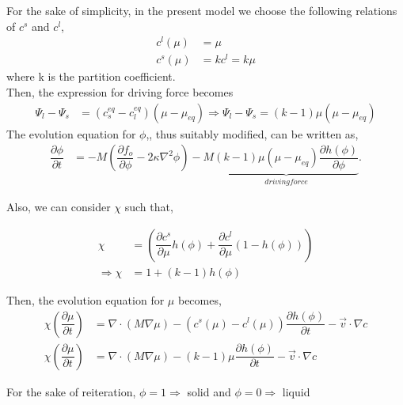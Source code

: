 \documentclass[12pt,a4paper]{report}
\begin{document}
For the sake of simplicity, in the present model we choose the following relations of $c^s$ and $c^l$,
\begin{align}
c^l\left(\mu\right) &= \mu \\
c^s\left(\mu\right) &= kc^l = k\mu
\end{align}
where k is the partition coefficient.\\

Then, the expression for driving force becomes
\begin{align}
 \Psi_l-\Psi_s &= (c_s^{eq} - c_l^{eq})\left(\mu-\mu_{eq}\right)
\Rightarrow \Psi_l-\Psi_s = (k - 1)\mu\left(\mu-\mu_{eq}\right)
\end{align} 
The evolution equation for $\phi$,, thus suitably modified, can be written as,
  \begin{align}
  \dfrac{\partial \phi}{\partial t} &= -M \left(\dfrac{\partial f_o}{\partial \phi} - 2\kappa\nabla^{2}\phi\right)  
					-M\underbrace{(k - 1)\mu\left(\mu-\mu_{eq}\right)\dfrac{\partial h\left(\phi\right)}{\partial \phi}}_{driving force}.
  \end{align}

Also, we can consider $\chi$ such that,

\begin{align}
	\chi  &= \left(\dfrac{\partial c^s}{\partial \mu}h\left(\phi\right) + \dfrac{\partial c^l}{\partial \mu}(1-h\left(\phi\right))\right)\\
	\Rightarrow\chi &= 1 + \left(k-1\right)h\left(\phi\right)
\end{align}

Then, the evolution equation for $\mu$ becomes,
\begin{align}
		\chi \left(\dfrac{\partial \mu}{\partial t}\right) &= \nabla \cdot \left(M\nabla\mu\right) 
	- \left(c^s\left(\mu\right) - c^l \left(\mu\right)\right)\dfrac{\partial h\left(\phi\right)}{\partial t}- \vec{v}\cdot\nabla c\\
		\chi \left(\dfrac{\partial \mu}{\partial t}\right) &= \nabla \cdot \left(M\nabla\mu\right) 
	- \left(k-1\right)\mu\dfrac{\partial h\left(\phi\right)}{\partial t}- \vec{v}\cdot\nabla c
\end{align}

For the sake of reiteration,
$\phi = 1 \Longrightarrow$ solid and $\phi = 0 \Longrightarrow$ liquid
\end{document}

